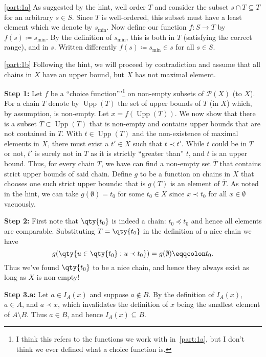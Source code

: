 \documentclass[boxes,pages,color=CornflowerBlue]{homework}
\DeclareMathOperator{\Upp}{Upp}
\begin{document}
\begin{solution}
    \ref{part:1a}
    As suggested by the hint, well order $T$ and consider the subset $s\cap T \subseteq T$ for an arbitrary $s \in S$.
    Since $T$ is well-ordered, this subset must have a least element which we denote by $s_\text{min}$.
    Now define our function $f: S \to T$ by $f(s) \coloneqq s_\text{min}$.
    By the definition of $s_\text{min}$, this is both in $T$ (satisfying the correct range), and in $s$.
    Written differently $f(s) \coloneqq s_\text{min} \in s$ for all $s \in S$.

    \ref{part:1b}
    Following the hint, we will proceed by contradiction and assume that all chains in $X$ have an upper bound, but $X$ has not maximal element.

    \textbf{Step 1:} Let $f$ be a ``choice function'''\footnote{I think this refers to the functions we work with in~\ref{part:1a}, but I don't think we ever defined what a choice function is.} on non-empty subsets of $\mathcal{P}(X)$ (to $X$).
    For a chain $T$ denote by $\Upp(T)$ the set of upper bounds of $T$ (in $X$) which, by assumption, is non-empty.
    Let $x = f(\Upp(T))$.
    We now show that there is a subset $\overline{T}\subset\Upp(T)$ that is non-empty and contains upper bounds that are not contained in $T$.
    With $t\in\Upp(T)$ and the non-existence of maximal elements in $X$, there must exist a $t'\in X$ such that $t \prec t'$.
    While $t$ could be in $T$ or not, $t'$ is surely not in $T$ as it is strictly ``greater than'' $t$, and $t$ is an upper bound.
    Thus, for every chain $T$, we have can find a non-empty set $\overline{T}$ that contains strict upper bounds of said chain.
    Define $g$ to be a function on chains in $X$ that chooses one such strict upper bounds: that is $g(T)$ is an element of $\overline{T}$.
    As noted in the hint, we can take $g(\emptyset) = t_0$ for some $t_0 \in X$ since $x \prec t_0$ for all $x\in\emptyset$ vacuously.

    \textbf{Step 2:} First note that $\qty{t_0}$ is indeed a chain: $t_0 \preceq t_0$ and hence all elements are comparable.
    Substituting $T = \qty{t_0}$ in the definition of a nice chain we have
    \begin{equation*}
        g(\qty{u \in \qty{t_0} : u \prec t_0}) = g(\emptyset) \eqqcolon t_0.
    \end{equation*}
    Thus we've found $\qty{t_0}$ to be a nice chain, and hence they always exist as long as $X$ is non-empty!

    \textbf{Step 3.a:} Let $a\in I_A(x)$ and suppose $a\notin B$.
    By the definition of $I_A(x)$, $a\in A$, and $a\prec x$, which invalidates the definition of $x$ being the smallest element of $A \setminus B$.
    Thus $a \in B$, and hence $I_A(x) \subseteq B$.


\end{solution}
\end{document}
